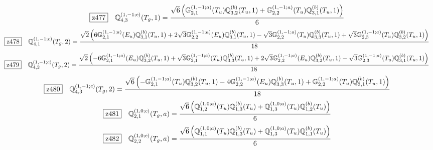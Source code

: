 \documentclass[fleqn,10pt,landscape]{jsarticle}
\begin{document}
\begin{dmath*}
\hspace*{3mm}\fbox{z477}\quad \mathbb{Q}_{4,3}^{(1,-1;c)}(T_{g},1)=\frac{\sqrt{6} \left(\mathbb{G}_{2,1}^{(1,-1;a)}(T_{u}) \mathbb{Q}_{3,2}^{(b)}(T_{u},1) + \mathbb{G}_{2,2}^{(1,-1;a)}(T_{u}) \mathbb{Q}_{3,1}^{(b)}(T_{u},1)\right)}{6}
\end{dmath*}
\begin{dmath*}
\hspace*{3mm}\fbox{z478}\quad \mathbb{Q}_{4,1}^{(1,-1;c)}(T_{g},2)=\frac{\sqrt{2} \left(6 \mathbb{G}_{2,1}^{(1,-1;a)}(E_{u}) \mathbb{Q}_{3,1}^{(b)}(T_{u},1) + 2 \sqrt{3} \mathbb{G}_{2,2}^{(1,-1;a)}(E_{u}) \mathbb{Q}_{3,1}^{(b)}(T_{u},1) - \sqrt{3} \mathbb{G}_{2,2}^{(1,-1;a)}(T_{u}) \mathbb{Q}_{3,3}^{(b)}(T_{u},1) + \sqrt{3} \mathbb{G}_{2,3}^{(1,-1;a)}(T_{u}) \mathbb{Q}_{3,2}^{(b)}(T_{u},1)\right)}{18}
\end{dmath*}
\begin{dmath*}
\hspace*{3mm}\fbox{z479}\quad \mathbb{Q}_{4,2}^{(1,-1;c)}(T_{g},2)=\frac{\sqrt{2} \left(- 6 \mathbb{G}_{2,1}^{(1,-1;a)}(E_{u}) \mathbb{Q}_{3,2}^{(b)}(T_{u},1) + \sqrt{3} \mathbb{G}_{2,1}^{(1,-1;a)}(T_{u}) \mathbb{Q}_{3,3}^{(b)}(T_{u},1) + 2 \sqrt{3} \mathbb{G}_{2,2}^{(1,-1;a)}(E_{u}) \mathbb{Q}_{3,2}^{(b)}(T_{u},1) - \sqrt{3} \mathbb{G}_{2,3}^{(1,-1;a)}(T_{u}) \mathbb{Q}_{3,1}^{(b)}(T_{u},1)\right)}{18}
\end{dmath*}
\begin{dmath*}
\hspace*{3mm}\fbox{z480}\quad \mathbb{Q}_{4,3}^{(1,-1;c)}(T_{g},2)=\frac{\sqrt{6} \left(- \mathbb{G}_{2,1}^{(1,-1;a)}(T_{u}) \mathbb{Q}_{3,2}^{(b)}(T_{u},1) - 4 \mathbb{G}_{2,2}^{(1,-1;a)}(E_{u}) \mathbb{Q}_{3,3}^{(b)}(T_{u},1) + \mathbb{G}_{2,2}^{(1,-1;a)}(T_{u}) \mathbb{Q}_{3,1}^{(b)}(T_{u},1)\right)}{18}
\end{dmath*}
\begin{dmath*}
\hspace*{3mm}\fbox{z481}\quad \mathbb{Q}_{2,1}^{(1,0;c)}(T_{g},a)=\frac{\sqrt{6} \left(\mathbb{Q}_{1,2}^{(1,0;a)}(T_{u}) \mathbb{Q}_{1,3}^{(b)}(T_{u}) + \mathbb{Q}_{1,3}^{(1,0;a)}(T_{u}) \mathbb{Q}_{1,2}^{(b)}(T_{u})\right)}{6}
\end{dmath*}
\begin{dmath*}
\hspace*{3mm}\fbox{z482}\quad \mathbb{Q}_{2,2}^{(1,0;c)}(T_{g},a)=\frac{\sqrt{6} \left(\mathbb{Q}_{1,1}^{(1,0;a)}(T_{u}) \mathbb{Q}_{1,3}^{(b)}(T_{u}) + \mathbb{Q}_{1,3}^{(1,0;a)}(T_{u}) \mathbb{Q}_{1,1}^{(b)}(T_{u})\right)}{6}
\end{dmath*}
\end{document}
